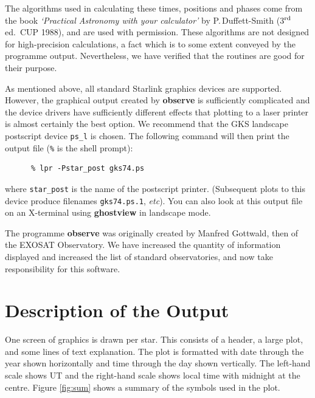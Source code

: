 \documentclass[11pt]{article}
\newcommand{\xlabel}[1]{}
\begin{document}
The algorithms used in calculating these times, positions and phases
come from the book {\em{`Practical Astronomy with your calculator'}}  by
P.\,Duffett-Smith (3$^{\rm rd}$ ed.~CUP 1988), and are used with
permission. These algorithms are not designed for high-precision
calculations, a fact which is to some extent conveyed by the programme
output. Nevertheless, we have verified that the routines are good for
their purpose.

As mentioned above, all standard Starlink graphics devices are
supported.  However, the graphical output created by {\bf{observe}} is
sufficiently complicated and the device drivers have sufficiently
different effects that plotting to a laser printer is almost certainly
the best option. We recommend that the GKS landscape postscript device
{\tt{ps\_l}} is chosen.  The following command will then print the
output file ({\tt{\%}} is the shell prompt):

\begin{verbatim}
      % lpr -Pstar_post gks74.ps
\end{verbatim}

where {\tt{star\_post}} is the name of the postscript printer.
(Subsequent plots to this device produce filenames {\tt gks74.ps.1},
{\em{etc}}). You can also look at this output file on an X-terminal
using {\bf{ghostview}} in landscape mode.

The programme {\bf{observe}} was originally created by Manfred Gottwald,
then of the EXOSAT Observatory. We have increased the quantity of
information displayed and increased the list of standard observatories,
and now take responsibility for this software.


\section{\xlabel{DESCRIPTION}Description of the Output}
\label{sec:description}

One screen of graphics is drawn per star. This consists of a header, a
large plot, and some lines of text explanation. The plot is formatted
with date through the year shown horizontally and time through the day
shown vertically. The  left-hand scale shows UT and the right-hand
scale shows local time with midnight at the centre. Figure
\ref{fig:sum} shows a summary of the symbols used in the plot.
\end{document}
